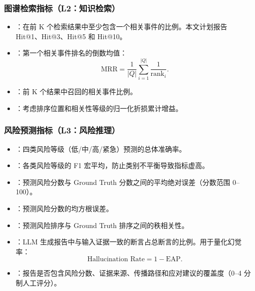 \subsubsection{图谱检索指标（L2：知识检索）}

\begin{itemize}
    \item {}：在前 K 个检索结果中至少包含一个相关事件的比例。本文计划报告 Hit@1、Hit@3、Hit@5 和 Hit@10。
    \item {}：第一个相关事件排名的倒数均值：
    \begin{equation}
    \text{MRR} = \frac{1}{|Q|}\sum_{i=1}^{|Q|}\frac{1}{\text{rank}_i}.
    \end{equation}
    \item {}：前 K 个结果中召回的相关事件比例。
    \item {}：考虑排序位置和相关性等级的归一化折损累计增益。
\end{itemize}

\subsubsection{风险预测指标（L3：风险推理）}

\begin{itemize}
    \item {}：四类风险等级（低/中/高/紧急）预测的总体准确率。
    \item {}：各类风险等级的 F1 宏平均，防止类别不平衡导致指标虚高。
    \item {}：预测风险分数与 Ground Truth 分数之间的平均绝对误差（分数范围 0--100）。
    \item {}：预测风险分数的均方根误差。
    \item {}：预测风险排序与 Ground Truth 排序之间的秩相关性。
    \item {}：LLM 生成报告中与输入证据一致的断言占总断言的比例。用于量化幻觉率：
    \begin{equation}
    \text{Hallucination Rate} = 1 - \text{EAP}.
    \end{equation}
    \item {}：报告是否包含风险分数、证据来源、传播路径和应对建议的覆盖度（0--4 分制人工评分）。
\end{itemize}

